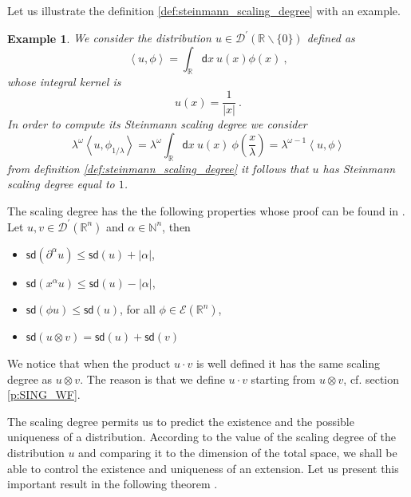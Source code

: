 \documentclass[11pt]{book}
\newcommand{\sd}{\mathsf{sd}}
\newcommand{\abs}[1]{\left|#1\right|}
\newcommand{\sm}[1]{\left\langle#1\right\rangle}
\newcommand{\Dcal}{\mathcal{D}}
\newcommand{\Ecal}{\mathcal{E}}
\newcommand{\Nbb}{\mathbb{N}}
\newcommand{\Rbb}{\mathbb{R}}
\newcommand{\dsf}{\mathsf{d}}
\theoremstyle{break}
\newtheorem{example}{Example}[chapter]
\begin{document}
Let us illustrate the definition \ref{def:steinmann_scaling_degree} with an example.


\begin{example}
We consider the distribution $u \in \Dcal^\prime(\Rbb \backslash \{0\})$ defined as 
%
\begin{equation*}
\sm{u, \phi} = \int_{\Rbb} \dsf x \ u(x) \phi(x)  \ ,
\end{equation*}
%
whose integral kernel is 
%
\begin{equation*}
u(x) = \frac{1}{\abs{x}} \ .
\end{equation*}
%
In order to compute its Steinmann scaling degree we consider
%
\begin{equation*}
\lambda^\omega \sm{u,\phi_{1/\lambda}} = \lambda^\omega \int_\Rbb \dsf x \ u(x) \ \phi\left(\frac{x}{\lambda}\right) = \lambda^{\omega-1} \sm{u , \phi} 
\end{equation*}
% 
from definition \ref{def:steinmann_scaling_degree} it follows that $u$ has Steinmann scaling degree equal to $1$.
\end{example}


The scaling degree has the the following properties whose proof can be found in \cite[theorem 5.1]{brunetti_microlocal_2000}. Let $u, v \in\Dcal^\prime(\Rbb^n)$ and $\alpha \in \Nbb^n$, then
%
\begin{itemize}
\setlength\itemsep{0pt}
\item $\sd(\partial^\alpha u) \leq \sd(u) + \abs{\alpha}$,
\item $\sd(x^\alpha u) \leq \sd(u) - \abs{\alpha}$,
\item $\sd(\phi u) \leq \sd(u)$, for all $\phi \in \Ecal(\Rbb^n)$, 
\item $\sd(u \otimes v) = \sd(u) + \sd(v)$
\end{itemize}
%
We notice that when the product $u \cdot v$ is well defined it has the same scaling degree as $u \otimes v$. The reason is that we define $u \cdot v$ starting from $u \otimes v$, cf. section \ref{p:SING_WF}.


The scaling degree permits us to predict the existence and the possible uniqueness of a distribution. According to the value of the scaling degree of the distribution $u$ and comparing it to the dimension of the total space, we shall be able to control the existence and uniqueness of an extension. Let us present this important result in the following theorem \cite[theorems 5.2 and 5.3]{brunetti_microlocal_2000}.
\end{document}
